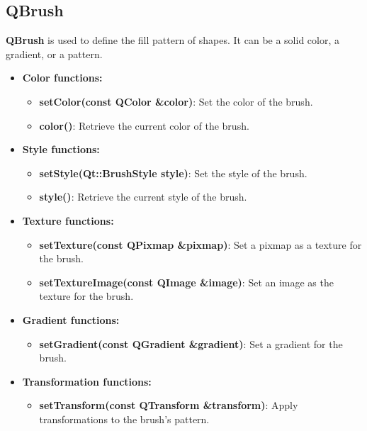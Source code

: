 \documentclass{report}
\begin{document}
    \subsection{QBrush}
    \bigbreak \noindent 
    \begin{concept}
        \textbf{QBrush} is used to define the fill pattern of shapes. It can be a solid color, a gradient, or a pattern.
        \begin{itemize}
            \item \textbf{Color functions:} 
                \begin{itemize}
                    \item \textbf{setColor(const QColor \&color)}: Set the color of the brush.
                    \item \textbf{color()}: Retrieve the current color of the brush.
                \end{itemize}
            \item \textbf{Style functions:} 
                \begin{itemize}
                    \item \textbf{setStyle(Qt::BrushStyle style)}: Set the style of the brush.
                    \item \textbf{style()}: Retrieve the current style of the brush.
                \end{itemize}
            \item \textbf{Texture functions:} 
                \begin{itemize}
                    \item \textbf{setTexture(const QPixmap \&pixmap)}: Set a pixmap as a texture for the brush.
                    \item \textbf{setTextureImage(const QImage \&image)}: Set an image as the texture for the brush.
                \end{itemize}
            \item \textbf{Gradient functions:} 
                \begin{itemize}
                    \item \textbf{setGradient(const QGradient \&gradient)}: Set a gradient for the brush.
                \end{itemize}
            \item \textbf{Transformation functions:} 
                \begin{itemize}
                    \item \textbf{setTransform(const QTransform \&transform)}: Apply transformations to the brush's pattern.
                \end{itemize}
        \end{itemize}
    \end{concept}
\end{document}
